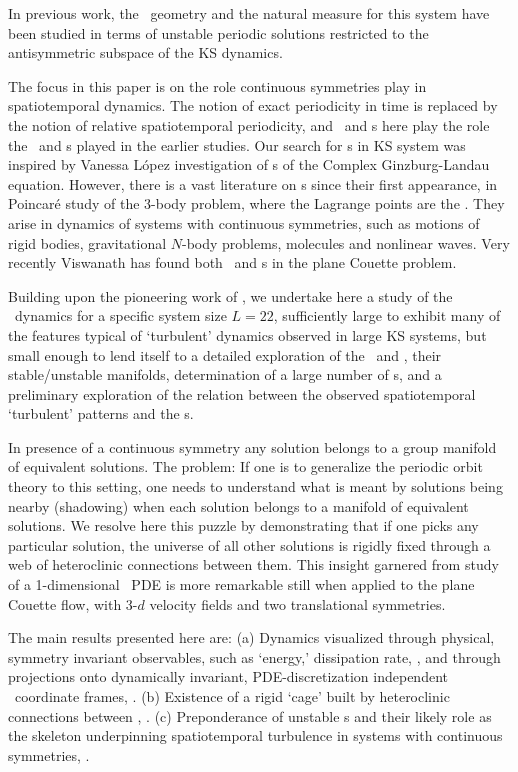 In previous work, the \statesp\ geometry and the natural measure for
this system have been
studied in terms of unstable
periodic solutions restricted to the antisymmetric subspace of the
KS dynamics.

The focus in this paper is on the role continuous symmetries play in
spatiotemporal dynamics.
The notion of exact periodicity in time is
replaced by the notion of relative spatiotemporal
periodicity, and \reqva\ and \rpo s here play the role the \eqva\
and \po s played in the earlier studies. Our search for \rpo s in KS system was inspired by Vanessa
L{\'o}pez\rf{lop05rel} investigation of {\rpo s} of the Complex
Ginzburg-Landau equation.  However, there is a vast literature on
{\rpo s} since their first appearance, in Poincar\'e study of the
3-body problem\rf{ChencinerLink,rtb}, where the Lagrange points are
the \reqva.  They arise in dynamics of systems with continuous
symmetries, such as motions of rigid bodies, gravitational $N$-body
problems, molecules and nonlinear waves.
Very recently Viswanath
has found both \reqva\ and \rpo s in the plane Couette problem.

Building upon the pioneering work of ,
we undertake here
a study of the \KS\ dynamics
for a specific system size $L = 22$, sufficiently large
to exhibit many of the features typical of `turbulent' dynamics
observed in large KS systems, but small enough to lend itself to a
detailed exploration of the  \eqva\ and \reqva,
their stable/unstable manifolds,
determination of a large number of
\rpo s, and a preliminary exploration of the relation between the
observed spatiotemporal `turbulent' patterns and the \rpo s.

In presence of a continuous symmetry any solution belongs to a group
manifold of equivalent solutions. The problem: If one is to
generalize the periodic orbit theory to this setting, one needs to
understand what is meant by solutions being nearby (shadowing) when
each solution belongs to a manifold of equivalent solutions. We
resolve here this puzzle by demonstrating that if one picks any
particular solution, the universe of all other solutions is rigidly
fixed through a web of heteroclinic connections between them. This
insight garnered from study of a 1-dimensional \KS\ PDE is more
remarkable still when applied to the plane Couette flow,
with 3-$d$ velocity fields and two translational symmetries.


The main results presented here are: (a) Dynamics visualized through
physical, symmetry invariant observables, such as `energy,'
dissipation rate, \etc,
and through
projections onto dynamically invariant, PDE-discretization
independent \statesp\ coordinate frames, . (b)
Existence of a rigid `cage' built by heteroclinic connections
between \eqva, . (c) Preponderance of
unstable \rpo s and their likely role as the skeleton underpinning
spatiotemporal turbulence in systems with continuous symmetries,
\refsect{sec:rpos}.
